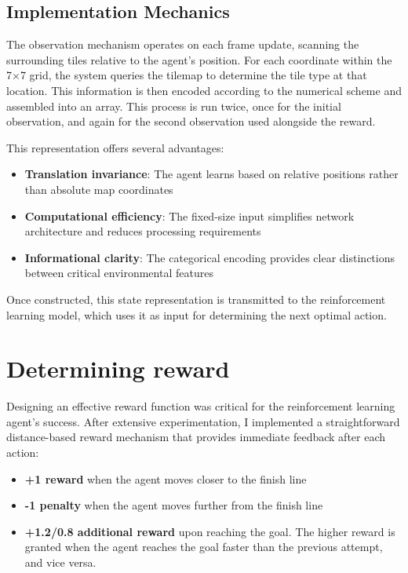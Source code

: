 \subsection{Implementation Mechanics}

The observation mechanism operates on each frame update, scanning the surrounding tiles relative to the agent's position. 
For each coordinate within the 7×7 grid, the system queries the tilemap to determine the tile type at that location. 
This information is then encoded according to the numerical scheme and assembled into an array.
This process is run twice, once for the initial observation, and again for the second observation used alongside the reward.

This representation offers several advantages:
\begin{itemize}
    \item \textbf{Translation invariance}: The agent learns based on relative positions rather than absolute map coordinates
    \item \textbf{Computational efficiency}: The fixed-size input simplifies network architecture and reduces processing requirements
    \item \textbf{Informational clarity}: The categorical encoding provides clear distinctions between critical environmental features
\end{itemize}

Once constructed, this state representation is transmitted to the reinforcement learning model, which uses it as input for determining the next optimal action. 

\section{Determining reward}
Designing an effective reward function was critical for the reinforcement learning agent's success. After extensive experimentation, I implemented a straightforward distance-based reward mechanism that provides immediate feedback after each action:

\begin{itemize}
    \item \textbf{+1 reward} when the agent moves closer to the finish line
    \item \textbf{-1 penalty} when the agent moves further from the finish line
    \item \textbf{+1.2/0.8 additional reward} upon reaching the goal. The higher reward is granted when the agent reaches the goal faster than the previous attempt, and vice versa.
\end{itemize}

